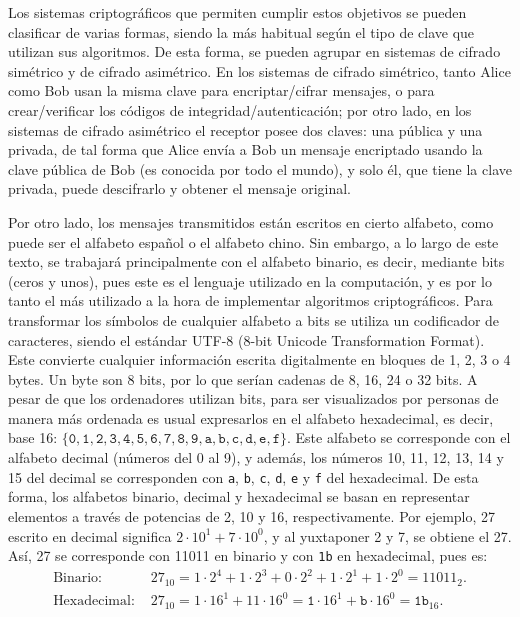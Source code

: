 Los sistemas criptográficos que permiten cumplir estos objetivos se pueden clasificar de varias formas, siendo la más habitual según el tipo de clave que utilizan sus algoritmos. De esta forma, se pueden agrupar en sistemas de cifrado simétrico y de cifrado asimétrico. En los sistemas de cifrado simétrico, tanto Alice como Bob usan la misma clave para encriptar/cifrar mensajes, o para crear/verificar los códigos de integridad/autenticación; por otro lado, en los sistemas de cifrado asimétrico el receptor posee dos claves: una pública y una privada, de tal forma que Alice envía a Bob un mensaje encriptado usando la clave pública de Bob (es conocida por todo el mundo), y solo él, que tiene la clave privada, puede descifrarlo y obtener el mensaje original.

Por otro lado, los mensajes transmitidos están escritos en cierto alfabeto, como puede ser el alfabeto español o el alfabeto chino. Sin embargo, a lo largo de este texto, se trabajará principalmente con el alfabeto binario, es decir, mediante bits (ceros y unos), pues este es el lenguaje utilizado en la computación, y es por lo tanto el más utilizado a la hora de implementar algoritmos criptográficos. Para transformar los símbolos de cualquier alfabeto a bits se utiliza un codificador de caracteres, siendo el estándar UTF-8 (8-bit Unicode Transformation Format)\cite{utf8_unicode}. Este convierte cualquier información escrita digitalmente en bloques de 1, 2, 3 o 4 bytes. Un byte son 8 bits, por lo que serían cadenas de 8, 16, 24 o 32 bits. A pesar de que los ordenadores utilizan bits, para ser visualizados por personas de manera más ordenada es usual expresarlos en el alfabeto hexadecimal, es decir, base 16:
$\{\texttt{0},\texttt{1},\texttt{2},\texttt{3},\texttt{4},\texttt{5},
\texttt{6},\texttt{7},\texttt{8},\texttt{9},\texttt{a},
\texttt{b},\texttt{c},\texttt{d},\texttt{e},\texttt{f}\}$.
Este alfabeto se corresponde con el alfabeto decimal (números del 0 al 9), y además, los números 10, 11, 12, 13, 14 y 15 del decimal se corresponden con \texttt{a}, \texttt{b}, \texttt{c}, \texttt{d}, \texttt{e} y \texttt{f} del hexadecimal. De esta forma, los alfabetos binario, decimal y hexadecimal se basan en representar elementos a  través de potencias de 2, 10 y 16, respectivamente. Por ejemplo, 27 escrito en decimal significa $2\cdot 10^1 + 7\cdot 10^0$, y al yuxtaponer 2 y 7, se obtiene el 27. Así, 27 se corresponde con 11011 en binario y con \texttt{1b} en hexadecimal, pues es:
\begin{align*}
    \text{Binario: } & 27_{10} = 1\cdot 2^4 + 1\cdot 2^3 +0\cdot 2^2+ 1\cdot 2^1+ 1\cdot 2^0 = 11011_2.    \\
    \text{Hexadecimal: } & 27_{10} = 1\cdot 16^1 + 11\cdot 16^0 = \texttt{1}\cdot 16^1 + \texttt{b}\cdot 16^0 = \texttt{1b}_{16}.
\end{align*}
